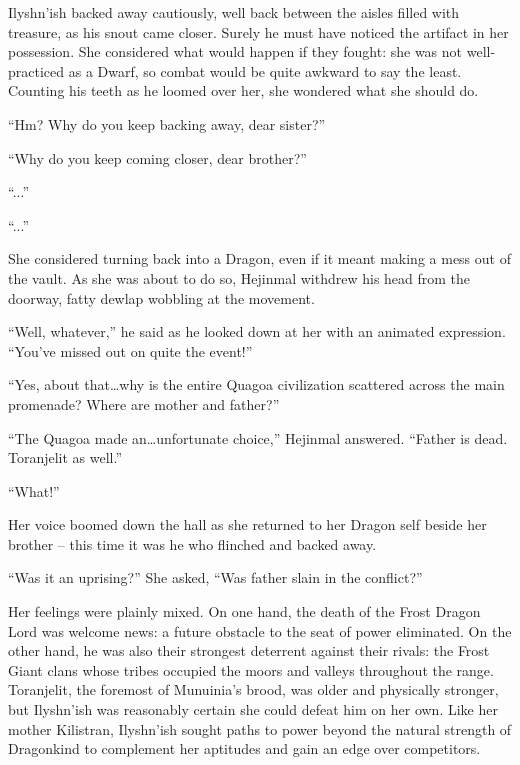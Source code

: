  

Ilyshn’ish backed away cautiously, well back between the aisles filled with treasure, as his snout came closer. Surely he must have noticed the artifact in her possession. She considered what would happen if they fought: she was not well-practiced as a Dwarf, so combat would be quite awkward to say the least. Counting his teeth as he loomed over her, she wondered what she should do.

 

“Hm? Why do you keep backing away, dear sister?”

 

“Why do you keep coming closer, dear brother?”

 

“...”

 

“...”

 

She considered turning back into a Dragon, even if it meant making a mess out of the vault. As she was about to do so, Hejinmal withdrew his head from the doorway, fatty dewlap wobbling at the movement.

 

“Well, whatever,” he said as he looked down at her with an animated expression. “You’ve missed out on quite the event!”

 

“Yes, about that…why is the entire Quagoa civilization scattered across the main promenade? Where are mother and father?”

 

“The Quagoa made an…unfortunate choice,” Hejinmal answered. “Father is dead. Toranjelit as well.”

 

“What!”

 

Her voice boomed down the hall as she returned to her Dragon self beside her brother – this time it was he who flinched and backed away.

 

“Was it an uprising?” She asked, “Was father slain in the conflict?”

 

Her feelings were plainly mixed. On one hand, the death of the Frost Dragon Lord was welcome news: a future obstacle to the seat of power eliminated. On the other hand, he was also their strongest deterrent against their rivals: the Frost Giant clans whose tribes occupied the moors and valleys throughout the range. Toranjelit, the foremost of Munuinia’s brood, was older and physically stronger, but Ilyshn’ish was reasonably certain she could defeat him on her own. Like her mother Kilistran, Ilyshn’ish sought paths to power beyond the natural strength of Dragonkind to complement her aptitudes and gain an edge over competitors.

